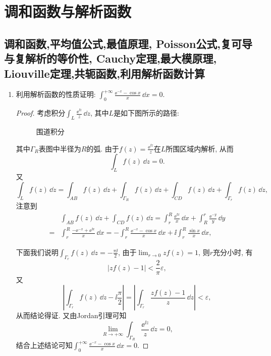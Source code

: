 \section{调和函数与解析函数}
\subsection{调和函数,平均值公式,最值原理, Poisson公式,复可导与复解析的等价性, Cauchy定理,最大模原理, Liouville定理,共轭函数,利用解析函数计算}
\begin{quiza}
\begin{enumerate}
\item 利用解析函数的性质证明: \(\int_{0}^{+\infty}\frac{\ee^{-x}-\cos x}{x}\,\dd x=0\).
\begin{proof}
考虑积分\(\int_{L}\frac{\ee^{\ii z}}{z}\,\dd z\), 其中\(L\)是如下图所示的路径:
\begin{figure}
\caption{围道积分}
\end{figure}
其中\(\Gamma_R\)表图中半径为\(R\)的弧. 
由于\(f(z)=\frac{\ee^{\ii z}}{z}\)在\(L\)所围区域内解析, 从而
\[\int_{L}f(z)\,\dd z=0.\]
又\[\int_{L}f(z)\,\dd z=\int_{AB}f(z)\,\dd z+\int_{\Gamma_R}f(z)\,\dd z
+\int_{CD}f(z)\,\dd z+\int_{\Gamma_r}f(z)\,\dd z,\]
注意到\[\begin{split}
&\int_{AB}f(z)\,\dd z+\int_{CD}f(z)\,\dd z 
=\int_{r}^{R}\frac{\ee^{\ii x}}{x}\,\dd x+\int_{R}^{r}\frac{\ee^{-y}}{y}\,\dd y\\
=&\int_{r}^{R}\frac{-\ee^{-x}+\ee^{\ii x}}{x}\,\dd x
=-\int_{r}^{R}\frac{\ee^{-x}-\cos x}{x}\,\dd x
+\ii\int_{r}^{R}\frac{\sin x}{x}\,\dd x,
\end{split}\]

下面我们说明\(\int_{\Gamma_r}f(z)\,\dd z=-\frac{\pi\ii}{2}\), 
由于\(\lim_{r\rightarrow 0}zf(z)=1\), 则\(r\)充分小时, 有
\[|z f(z)-1|<\frac{2}{\pi}\varepsilon,\]
又\[\left|\int_{\Gamma_r}f(z)\,\dd z-\ii\frac{\pi}{2}\right|
=\left|\int_{\Gamma_r}\frac{zf(z)-1}{z}\,\dd z\right|<\varepsilon,\]
从而结论得证. 又由Jordan引理可知
\[\lim_{R\rightarrow+\infty}\int_{\Gamma_R}\frac{\ee^{\ii z}}{z}\,\dd z=0,\]
结合上述结论可知\(\int_{0}^{+\infty}\frac{\ee^{-x}-\cos x}{x}\,\dd x=0\).
\end{proof}


\end{enumerate}
\end{quiza}
